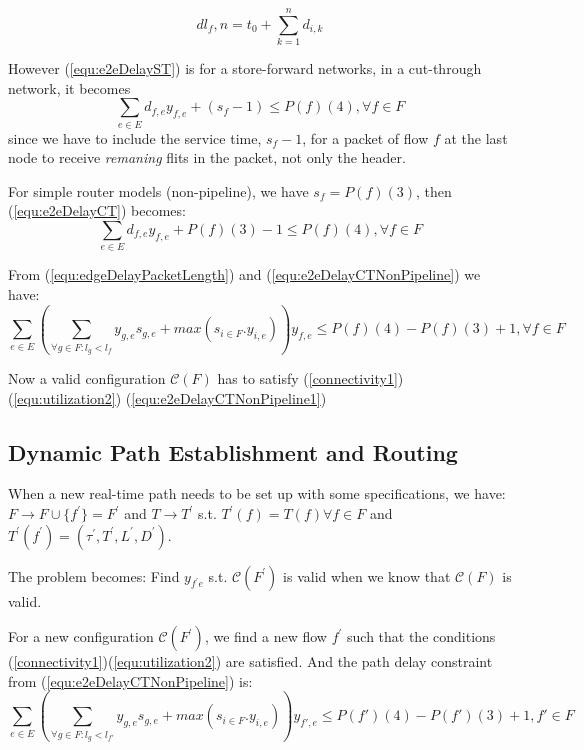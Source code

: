 \documentclass[10pt]{article}
\begin{document}
\begin{equation}\label{equ:deadline2}
dl_f,n=t_0 + \sum_{k=1}^{n}d_{i,k}
\end{equation}

However (\ref{equ:e2eDelayST}) is for a store-forward networks, in a
cut-through network, it becomes
\begin{equation}\label{equ:e2eDelayCT}
\sum_{e \in E}d_{f,e}y_{f,e} + (s_f - 1) \leq P(f)(4), \forall f \in F
\end{equation}
since we have to include the service time, $s_f-1$, for a packet of flow $f$ at
the last node to receive {\em remaning} flits in the packet, not only the
header.

For simple router models (non-pipeline), we have $s_f = P(f)(3)$, then
(\ref{equ:e2eDelayCT}) becomes:
\begin{equation}\label{equ:e2eDelayCTNonPipeline}
\sum_{e \in E}d_{f,e}y_{f,e} + P(f)(3) - 1 \leq P(f)(4), \forall f \in F
\end{equation}

From (\ref{equ:edgeDelayPacketLength}) and (\ref{equ:e2eDelayCTNonPipeline}) we have:
\begin{equation}\label{equ:e2eDelayCTNonPipeline1}
\sum_{e \in E} (\sum_{\forall g \in F:l_g <
l_{f}}y_{g,e}s_{g,e}+max(s_{i \in F}.y_{i,e}))y_{f,e} \leq P(f)(4)-P(f)(3) + 1,
\forall f \in F
\end{equation}

Now a valid configuration $\mathcal{C}(F)$ has to satisfy (\ref{connectivity1}) 
(\ref{equ:utilization2}) (\ref{equ:e2eDelayCTNonPipeline1})

\subsection{Dynamic Path Establishment and Routing}
When a new real-time path needs to be set up with some specifications, we have:
$F \rightarrow F \cup \{f^{'} \}=F^{'}$
and $T \rightarrow T^{'}$ s.t. $T^{'} (f)=T(f)\forall f \in F$ and $T^{'} (f^{'} )=(\tau ^{'}, T^{'}, L^{'}, D^{'})$.

The problem becomes: Find $y_{f^{'}e}$ s.t. $\mathcal{C}(F^{'})$ is valid
when we know that $\mathcal{C}(F)$ is valid.

For a new configuration $\mathcal{C}(F^{'})$, we find a new flow $f^{'}$ such that
the conditions (\ref{connectivity1})(\ref{equ:utilization2}) are satisfied. And
the path delay constraint from (\ref{equ:e2eDelayCTNonPipeline}) is:
\begin{equation}\label{equ:e2eDelayNewPath}
\sum_{e \in E} (\sum_{\forall g \in F:l_g <
l_{f'}}y_{g,e}s_{g,e}+max(s_{i \in F}.y_{i,e}))y_{f',e} \leq P(f')(4)-P(f')(3) +
1, f' \in F
\end{equation}
\end{document}
